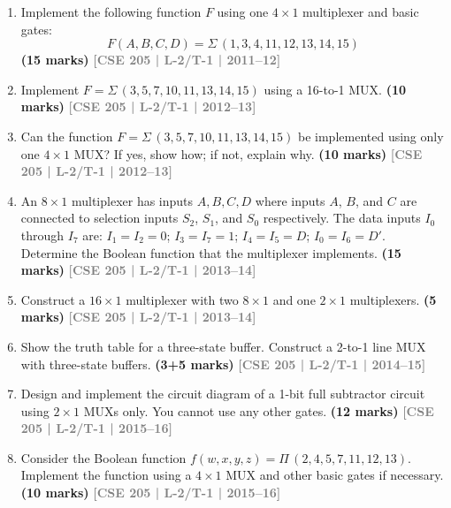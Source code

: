 \documentclass[12pt,a4paper]{article}
\newcommand{\yr}[1]{\hfill\textcolor{gray}{\small\textbf{[#1]}}}
\newcommand{\mk}[1]{\textcolor{orange!70!black}{\small\textbf{(#1 marks)}}}
\begin{document}
\begin{enumerate}

\item Implement the following function $F$ using one $4 \times 1$ multiplexer and basic gates:
\[ F(A,B,C,D) = \Sigma\,(1,3,4,11,12,13,14,15) \]
\mk{15} \yr{CSE 205 | L-2/T-1 | 2011--12}

\item Implement $F = \Sigma\,(3,5,7,10,11,13,14,15)$ using a 16-to-1 MUX.
\mk{10} \yr{CSE 205 | L-2/T-1 | 2012--13}

\item Can the function $F = \Sigma\,(3,5,7,10,11,13,14,15)$ be implemented using only one $4 \times 1$ MUX? If yes, show how; if not, explain why.
\mk{10} \yr{CSE 205 | L-2/T-1 | 2012--13}

\item An $8 \times 1$ multiplexer has inputs $A, B, C, D$ where inputs $A$, $B$, and $C$ are connected to selection inputs $S_2$, $S_1$, and $S_0$ respectively. The data inputs $I_0$ through $I_7$ are: $I_1 = I_2 = 0$; $I_3 = I_7 = 1$; $I_4 = I_5 = D$; $I_0 = I_6 = D'$. Determine the Boolean function that the multiplexer implements.
\mk{15} \yr{CSE 205 | L-2/T-1 | 2013--14}

\item Construct a $16 \times 1$ multiplexer with two $8 \times 1$ and one $2 \times 1$ multiplexers.
\mk{5} \yr{CSE 205 | L-2/T-1 | 2013--14}


\item Show the truth table for a three-state buffer. Construct a 2-to-1 line MUX with three-state buffers.
\mk{3+5} \yr{CSE 205 | L-2/T-1 | 2014--15}


\item Design and implement the circuit diagram of a 1-bit full subtractor circuit using $2\times1$ MUXs only. You cannot use any other gates.
\mk{12} \yr{CSE 205 | L-2/T-1 | 2015--16}


\item Consider the Boolean function $f(w, x, y, z) = \Pi\,(2,4,5,7,11,12,13)$. Implement the function using a $4 \times 1$ MUX and other basic gates if necessary.
\mk{10} \yr{CSE 205 | L-2/T-1 | 2015--16}



\end{enumerate}
\end{document}
